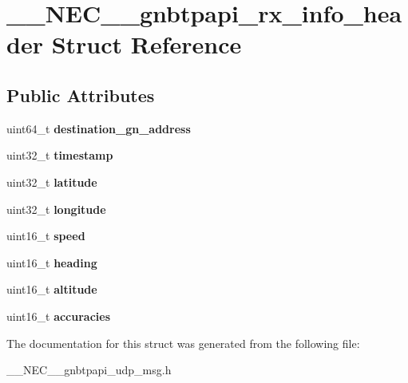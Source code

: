 \hypertarget{struct____NEC____gnbtpapi__rx__info__header}{\section{\-\_\-\-\_\-\-N\-E\-C\-\_\-\-\_\-gnbtpapi\-\_\-rx\-\_\-info\-\_\-header \-Struct \-Reference}
\label{struct____NEC____gnbtpapi__rx__info__header}
}
\subsection*{\-Public \-Attributes}
\begin{DoxyCompactItemize}
\item 
\hypertarget{struct____NEC____gnbtpapi__rx__info__header_ab62b56efbe494c7f5b2312b6357713a1}{uint64\-\_\-t {\bfseries destination\-\_\-gn\-\_\-address}}\label{struct____NEC____gnbtpapi__rx__info__header_ab62b56efbe494c7f5b2312b6357713a1}

\item 
\hypertarget{struct____NEC____gnbtpapi__rx__info__header_a5fb505d41098e22f3a18d4eb879a4873}{uint32\-\_\-t {\bfseries timestamp}}\label{struct____NEC____gnbtpapi__rx__info__header_a5fb505d41098e22f3a18d4eb879a4873}

\item 
\hypertarget{struct____NEC____gnbtpapi__rx__info__header_a20341b5b53cd97eb26409239ddf28f13}{uint32\-\_\-t {\bfseries latitude}}\label{struct____NEC____gnbtpapi__rx__info__header_a20341b5b53cd97eb26409239ddf28f13}

\item 
\hypertarget{struct____NEC____gnbtpapi__rx__info__header_abd7d07e6d174be8e58032b6f78a9c5ee}{uint32\-\_\-t {\bfseries longitude}}\label{struct____NEC____gnbtpapi__rx__info__header_abd7d07e6d174be8e58032b6f78a9c5ee}

\item 
\hypertarget{struct____NEC____gnbtpapi__rx__info__header_a7b264933f1477cee7ee63efd556b3e65}{uint16\-\_\-t {\bfseries speed}}\label{struct____NEC____gnbtpapi__rx__info__header_a7b264933f1477cee7ee63efd556b3e65}

\item 
\hypertarget{struct____NEC____gnbtpapi__rx__info__header_a5689170fc06361528864381722325c6f}{uint16\-\_\-t {\bfseries heading}}\label{struct____NEC____gnbtpapi__rx__info__header_a5689170fc06361528864381722325c6f}

\item 
\hypertarget{struct____NEC____gnbtpapi__rx__info__header_a7114236ba0fe5a506af5c3dda5ebe0f7}{uint16\-\_\-t {\bfseries altitude}}\label{struct____NEC____gnbtpapi__rx__info__header_a7114236ba0fe5a506af5c3dda5ebe0f7}

\item 
\hypertarget{struct____NEC____gnbtpapi__rx__info__header_a7b51da2d26b0ad2d983f0de51d79b07f}{uint16\-\_\-t {\bfseries accuracies}}\label{struct____NEC____gnbtpapi__rx__info__header_a7b51da2d26b0ad2d983f0de51d79b07f}

\end{DoxyCompactItemize}


\-The documentation for this struct was generated from the following file\-:\begin{DoxyCompactItemize}
\item 
\-\_\-\-\_\-\-N\-E\-C\-\_\-\-\_\-gnbtpapi\-\_\-udp\-\_\-msg.\-h\end{DoxyCompactItemize}

